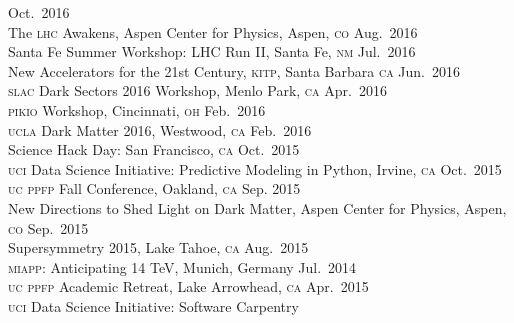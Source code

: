 \documentclass[margin,line]{resume}
\newcommand{\scap}[1]{\textsc{\MakeLowercase{#1}}}
\begin{document}
\begin{resume}
\hfill Oct.~2016\vspace{.7mm}\\   
%
The \scap{LHC} Awakens, Aspen Center for Physics, Aspen, \scap{CO}
\hfill Aug.~2016\vspace{.7mm}\\   
%
Santa Fe Summer Workshop: LHC Run II, Santa Fe, \scap{NM}
\hfill
Jul.~2016\vspace{.7mm}\\   
% 
New Accelerators for the 21st Century, \scap{KITP}, Santa Barbara \scap{CA}
\hfill 
Jun.~2016\vspace{.7mm}\\   
%
\scap{SLAC} Dark Sectors 2016 Workshop, Menlo Park, \scap{CA}
\hfill 
Apr.~2016\vspace{.7mm}\\   
%
\scap{PIKIO} Workshop, Cincinnati, \scap{OH}
\hfill 
Feb.~2016\vspace{.7mm}\\   
%
\scap{UCLA} Dark Matter 2016, Westwood, \scap{CA}
\hfill 
Feb.~2016\vspace{.7mm}\\   
%
Science Hack Day: San Francisco, \scap{CA}
\hfill 
Oct.~2015\vspace{.7mm}\\   
%
\scap{UCI} Data Science Initiative: Predictive Modeling in Python, Irvine, \scap{CA}
\hfill 
Oct.~2015\vspace{.7mm}\\   
%
\scap{UC PPFP} Fall Conference, Oakland, \scap{CA}
\hfill 
Sep. 2015\vspace{.7mm}\\   
%
New Directions to Shed Light on Dark Matter, Aspen Center for Physics, Aspen, \scap{CO}
\hfill Sep.~2015\vspace{.7mm}\\   
%
Supersymmetry 2015, Lake Tahoe, \scap{CA}
\hfill Aug.~2015\vspace{.7mm}\\   
%
\scap{MIAPP}: Anticipating 14 TeV, Munich, Germany
\hfill Jul.~2014\vspace{.7mm}\\   
%
\scap{UC PPFP} Academic Retreat, Lake Arrowhead, \scap{CA}
\hfill Apr.~2015\vspace{.7mm}\\   
%
\scap{UCI} Data Science Initiative: Software Carpentry

\end{resume}
\end{document}
